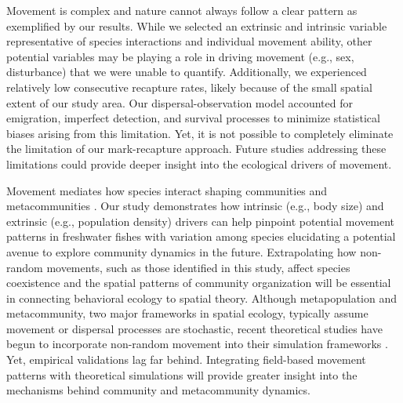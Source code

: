 \documentclass[11pt, class=article, crop=false]{standalone}
\begin{document}
Movement is complex and nature cannot always follow a clear pattern as exemplified by our results. While we selected an extrinsic and intrinsic variable representative of species interactions and individual movement ability, other potential variables may be playing a role in driving movement (e.g., sex, disturbance) that we were unable to quantify. Additionally, we experienced relatively low consecutive recapture rates, likely because of the small spatial extent of our study area. Our dispersal-observation model accounted for emigration, imperfect detection, and survival processes to minimize statistical biases arising from this limitation. Yet, it is not possible to completely eliminate the limitation of our mark-recapture approach. Future studies addressing these limitations could provide deeper insight into the ecological drivers of movement.

Movement mediates how species interact shaping communities and metacommunities \citep{schlagelMovementmediatedCommunityAssembly2020}. Our study demonstrates how intrinsic (e.g., body size) and extrinsic (e.g., population density) drivers can help pinpoint potential movement patterns in freshwater fishes with variation among species elucidating a potential avenue to explore community dynamics in the future. Extrapolating how non-random movements, such as those identified in this study, affect species coexistence and the spatial patterns of community organization will be essential in connecting behavioral ecology to spatial theory. Although metapopulation and metacommunity, two major frameworks in spatial ecology, typically assume movement or dispersal processes are stochastic, recent theoretical studies have begun to incorporate non-random movement into their simulation frameworks \citep{amarasekareEffectNonrandomDispersal2010, ruokolainenStableCoexistenceEcologically2016}. Yet, empirical validations lag far behind. Integrating field-based movement patterns with theoretical simulations will provide greater insight into the mechanisms behind community and metacommunity dynamics.


\end{document}
